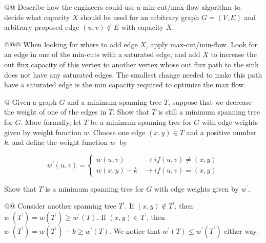 \documentclass[10pt]{article}\usepackage[]{graphicx}\usepackage[]{xcolor}
\makeatletter
\newenvironment{kframe}{%
 \def\at@end@of@kframe{}%
 \ifinner\ifhmode%
  \def\at@end@of@kframe{\end{minipage}}%
  \begin{minipage}{\columnwidth}%
 \fi\fi%
 \def\FrameCommand##1{\hskip\@totalleftmargin \hskip-\fboxsep
 \colorbox{shadecolor}{##1}\hskip-\fboxsep
     \hskip-\linewidth \hskip-\@totalleftmargin \hskip\columnwidth}%
 \MakeFramed {\advance\hsize-\width
   \@totalleftmargin\z@ \linewidth\hsize
   \@setminipage}}%
 {\par\unskip\endMakeFramed%
 \at@end@of@kframe}
\newenvironment{knitrout}{}{} %
\makeatother
\begin{document}
\begin{easylist}[enumerate]
\begin{knitrout}
\color{fgcolor}\begin{kframe}


{\ttfamily\noindent\bfseries{}}

{\ttfamily\noindent\bfseries{}}\end{kframe}
\end{knitrout}

    @@ Describe how the engineers could use a min-cut/max-flow algorithm to decide what capacity $X$ should be used for
    an arbitrary graph $G = (V, E)$ and arbitrary proposed edge $(u, v) \not\in E$ with capacity $X$.

    @@@ When looking for where to add edge $X$, apply max-cut/min-flow.  Look for an edge in one of the min-cuts with a
    saturated edge, and add $X$ to increase the out flux capacity of this vertex to another vertex whose out flux path
    to the sink does not have any saturated edges.  The smallest change needed to make this path have a saturated edge
    is the min capacity required to optimize the max flow.

    @ Given a graph $G$ and a minimum spanning tree $T$, suppose that we decrease the weight of one of the edges in $T$.
    Show that $T$ is still a minimum spanning tree for $G$. More formally, let $T$ be a minimum spanning tree for $G$
    with edge weights given by weight function $w$. Choose one edge $(x, y) \in T$ and a positive number $k$, and define
    the weight function $w^\prime$ by

    \[
        w^\prime (u, v) =
        \begin{cases}
            w(u, v) &\to if (u, v) \neq (x, y)\\
            w(x, y) - k &\to if (u, v) = (x, y)
        \end{cases}
    \]

    Show that $T$ is a minimum spanning tree for $G$ with edge weights given by $w^\prime$.

    @@ Consider another spanning tree $T^\prime$. If $(x,y) \not\in T^\prime$, then $w^\prime (T^\prime) = w(T^\prime)
    \ge w^\prime(T)$. If $(x,y) \in T^\prime$, then $w^\prime(T^\prime) = w(T^\prime)-k \ge w^\prime(T)$. We notice that
    $w^\prime(T) \le w^\prime(T^\prime)$ either way.


\end{easylist}
\end{document}
